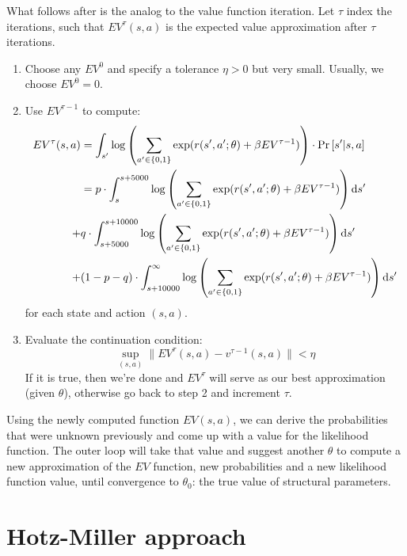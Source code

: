 What follows after is the analog to the value function iteration. Let $\tau$ index the iterations, such that $EV^\tau(s, a)$ is the expected value approximation after $\tau$ iterations. \begin{enumerate}
\item Choose any $EV^0$ and specify a tolerance $\eta >0$ but very small. Usually, we choose $EV^0 = 0$.
\item Use $EV^{\tau-1}$ to compute: \begin{align*}
EV^\tau(s, a) & = \int_{s'} \log \left( \sum_{a' \in \{0, 1\}} \exp( r( s', a'; \theta) + \beta EV^{\tau-1} ) \right) \cdot \operatorname{Pr}\left[s'|s, a\right]  \\
& = p \cdot \int_{s}^{s+5000} \log \left( \sum_{a' \in \{0, 1\}} \exp( r( s', a'; \theta) + \beta EV^{\tau-1} ) \right) \mathrm{d} s' \\
+ & q \cdot \int_{s+5000}^{s+10000} \log \left( \sum_{a' \in \{0, 1\}} \exp( r( s', a'; \theta) + \beta EV^{\tau-1} ) \right) \mathrm{d} s' \\
+ & (1 - p - q) \cdot \int_{s+10000}^{\infty} \log \left( \sum_{a' \in \{0, 1\}} \exp( r( s', a'; \theta) + \beta EV^{\tau-1} ) \right) \mathrm{d} s'
\end{align*} for each state and action $(s, a)$.
\item Evaluate the continuation condition:
$$ \sup_{(s, a)} \lVert EV^{\tau}(s, a) - v^{\tau-1}(s, a) \rVert < \eta $$ If it is true, then we're done and $EV^\tau$ will serve as our best approximation (given $\theta$), otherwise go back to step 2 and increment $\tau$.
\end{enumerate}

Using the newly computed function $EV(s, a)$, we can derive the probabilities that were unknown previously and come up with a value for the likelihood function. The outer loop will take that value and suggest another $\theta$ to compute a new approximation of the $EV$ function, new probabilities and a new likelihood function value, until convergence to $\theta_0$: the true value of structural parameters.

\section{Hotz-Miller approach}

